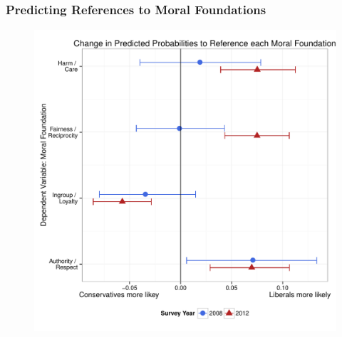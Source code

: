 \documentclass{beamer}
\begin{document}
\subsection{}
\begin{frame}%
  \frametitle{Predicting References to Moral Foundations}
  \begin{figure}[ht]\centering
    \includegraphics[height=.9\textheight]{../calc/fig/m1_mft}
  \end{figure}
\end{frame}
\end{document}
